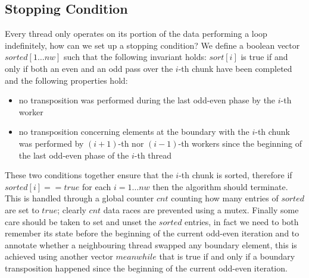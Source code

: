 \documentclass[12pt]{article}
\begin{document}
\subsection{Stopping Condition}
Every thread only operates on its portion of the data performing a
loop indefinitely, how can we set up a stopping condition? We define a
boolean vector $sorted[1\dots nw]$ such that the following invariant
holds: $sort[i]$ is true if and only if both an even and an odd pass
  over the $i$-th chunk have been completed and the following
  properties hold:
\begin{itemize}
\item no transposition was performed during the last
  odd-even phase by the $i$-th worker
  \item no transposition concerning elements at the boundary with the
    $i$-th chunk was performed by $(i + 1)$-th nor $(i -
    1)$-th workers since the beginning of the last odd-even phase of
    the $i$-th thread
\end{itemize}
These two conditions together ensure that the $i$-th chunk is sorted,
therefore if $sorted[i] == true$ for each $i = 1 \dots nw$ then the
algorithm should terminate. This is handled through a global counter
$cnt$ counting how many entries of $sorted$ are set to $true$; clearly
$cnt$ data races are prevented using a mutex. Finally some care should
be taken to set and unset the $sorted$ entries, in fact we need to both
remember its state before the beginning of the current odd-even
iteration and to annotate whether a neighbouring thread swapped any
boundary element, this is achieved using another vector $meanwhile$
that is true if and only if a boundary transposition happened since
the beginning of the current odd-even iteration.
\end{document}
